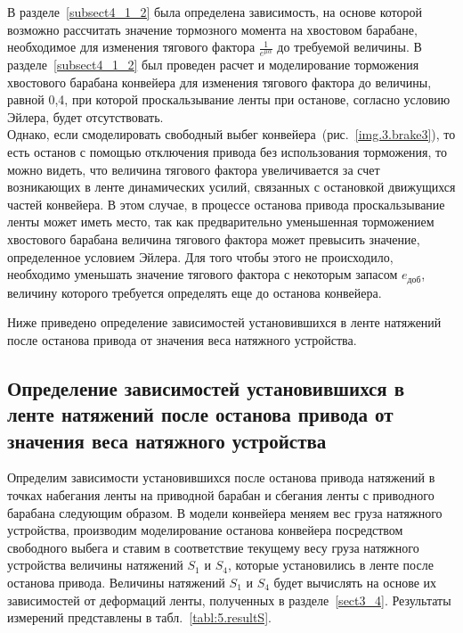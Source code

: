 В разделе~\ref{subsect4_1_2} была определена зависимость, на основе которой возможно рассчитать значение тормозного момента на хвостовом барабане, необходимое для изменения тягового фактора $ \frac{1}{e^{\mu\alpha}} $ до требуемой величины. В разделе~\ref{subsect4_1_2} был проведен расчет и моделирование торможения хвостового барабана конвейера для изменения тягового фактора до величины, равной 0,4, при которой проскальзывание ленты при останове, согласно условию Эйлера, будет отсутствовать.\\

Однако, если смоделировать свободный выбег конвейера~(рис.~\ref{img.3.brake3}), то есть останов с помощью отключения привода без использования торможения, то можно видеть, что величина тягового фактора увеличивается за счет возникающих в ленте динамических усилий, связанных с остановкой движущихся частей конвейера.
В этом случае, в процессе останова привода проскальзывание ленты может иметь место, так как предварительно уменьшенная торможением хвостового барабана величина тягового фактора может превысить значение, определенное условием Эйлера. Для того чтобы этого не происходило, необходимо уменьшать значение тягового фактора с некоторым запасом $ e_\text{доб} $, величину которого требуется определять еще до останова конвейера.

Ниже приведено определение зависимостей установившихся в ленте натяжений после останова привода от значения веса натяжного устройства.

\subsection{Определение зависимостей установившихся в ленте натяжений после останова привода от значения веса натяжного устройства} \label{sect54_2_1}
Определим зависимости установившихся после останова привода натяжений в точках набегания ленты на приводной барабан и сбегания ленты с приводного барабана следующим образом. В модели конвейера меняем вес груза натяжного устройства, производим моделирование останова конвейера посредством свободного выбега и ставим в соответствие текущему весу груза натяжного устройства величины натяжений $ S_1 $ и $ S_4 $, которые установились в ленте после останова привода. Величины натяжений $ S_1 $ и $ S_4 $ будет вычислять на основе их зависимостей от деформаций ленты, полученных в разделе~\ref{sect3_4}. Результаты измерений представлены в табл.~\ref{tabl:5.resultS}.\\

